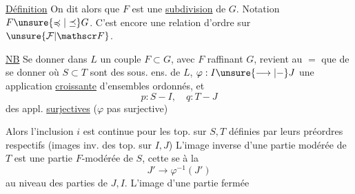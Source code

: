 \uline{Définition} On dit alors que $F$ est une \uline{subdivision} de $G$.
Notation $F\unsure{\preccurlyeq|\preceq}G$. C'est encore une relation d'ordre sur $\unsure{\mathcal F|\mathscr F}$.

\uline{NB} Se donner dans $L$ un couple $F\subset G$, avec $F$ raffinant $G$, revient au $=$ que de se donner
où $S\subset T$ sont des sous. ens. de $L$, $\varphi:I\unsure{\longrightarrow|-}J$ une application \uline{croissante} d'ensembles ordonnés, et 
\[p:S-I,\quad q:T-J\]
des appl. \uline{surjectives} ($\varphi$ pas  surjective)

Alors l'inclusion $i$ est continue pour les top.  sur $S,T$ définies par leurs préordres respectifs (images inv. des top. sur $I,J$) L'image inverse d'une partie modérée de $T$ est une partie $F$-modérée de $S$, cette  se  à la 
\[J'\longrightarrow\varphi^{-1}(J')\]
au niveau des parties de $J,I$. L'image  d'une partie fermée
